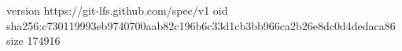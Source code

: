 version https://git-lfs.github.com/spec/v1
oid sha256:c730119993eb9740700aab82c196b6c33d1cb3bb966ca2b26e8dc0d4dedaca86
size 174916
